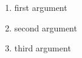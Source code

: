\documentclass[a4paper]{article}
\date{none}
\begin{document}
\begin{enumerate}
\item first argument
\item second argument 
\item third argument
\end{enumerate} 
\end{document}
